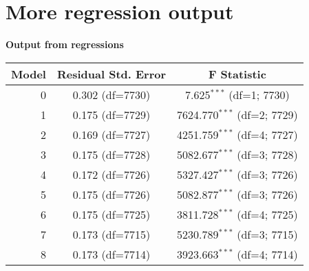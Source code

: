 \documentclass[11pt]{article}
\begin{document}
\section{More regression output}
\begin{table}[H]
    \centering
    \textbf{Output from regressions}\\
    \begin{tabular}{r|cc}
        \toprule
        Model & Residual Std. Error & F Statistic\\\midrule
        0&0.302 (df=7730)&7.625$^{***}$ (df=1; 7730)\\
        1&0.175 (df=7729)&7624.770$^{***}$ (df=2; 7729)\\
        2&0.169 (df=7727)&4251.759$^{***}$ (df=4; 7727)\\
        3&0.175 (df=7728)&5082.677$^{***}$ (df=3; 7728)\\
        4&0.172 (df=7726)&5327.427$^{***}$ (df=3; 7726)\\
        5&0.175 (df=7726)&5082.877$^{***}$ (df=3; 7726)\\
        6&0.175 (df=7725)&3811.728$^{***}$ (df=4; 7725)\\
        7&0.173 (df=7715)&5230.789$^{***}$ (df=3; 7715)\\
        8&0.173 (df=7714)&3923.663$^{***}$ (df=4; 7714)
    \end{tabular}
\end{table}
\end{document}
